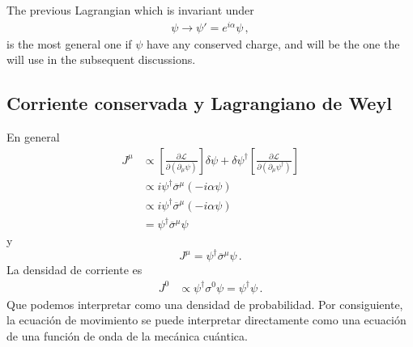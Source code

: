 \begin{frame}
The previous Lagrangian which is invariant under
\begin{align}
  \psi\to \psi'=e^{i\alpha}\psi\,,
\end{align}
is the most general one if $\psi$ have any conserved charge, and will be the one the will use in the subsequent discussions.
\end{frame}


\subsection{Corriente conservada y Lagrangiano de Weyl}
\label{sec:corriente-conservada}
\begin{frame}
En general
\begin{align}
   J^\mu&\propto\left[\frac{\partial\mathcal{L}}{\partial\left(\partial_\mu\psi\right)}\right]\delta\psi+\delta\psi^\dagger\left[\frac{\partial\mathcal{L}}{\partial\left(\partial_\mu\psi^\dagger\right)}\right]\nonumber\\
   &\propto i\psi^\dagger \overline{\sigma}^\mu(-i\alpha\psi)\nonumber\\
   &\propto i\psi^\dagger \overline{\sigma}^\mu(-i\alpha\psi)\nonumber\\
   &=\psi^\dagger \overline{\sigma}^\mu\psi
\end{align}
y
\begin{equation}
     J^\mu=\psi^\dagger  \overline{\sigma}^\mu\psi\,.
\end{equation}
La  densidad de corriente es
\begin{align}
  J^0&\propto \psi^\dagger \sigma^0\psi=\psi^{\dagger}\psi\,.
\end{align}
Que podemos interpretar como una densidad de probabilidad. Por consiguiente, la ecuación de movimiento se puede interpretar directamente como una ecuación de una función de onda de la mecánica cuántica.
\end{frame}

